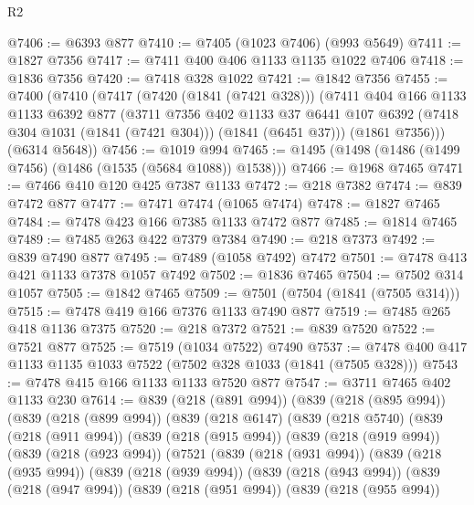 \begin{lexlean}{R2}
\begin{coremodule}
@7406 := @6393 @877
@7410 := @7405 (@1023 @7406) (@993 @5649)
@7411 := @1827 @7356
@7417 := @7411 @400 @406 @1133 @1135 @1022 @7406
@7418 := @1836 @7356
@7420 := @7418 @328 @1022
@7421 := @1842 @7356
@7455 := @7400
    (@7410
      (@7417
        (@7420 (@1841 (@7421 @328)))
        (@7411
          @404
          @166
          @1133
          @1133
          @6392
          @877
          (@3711
            @7356
            @402
            @1133
            @37
            @6441
            @107
            @6392
            (@7418 @304 @1031 (@1841 (@7421 @304)))
            (@1841 (@6451 @37)))
          (@1861 @7356)))
      (@6314 @5648))
@7456 := @1019 @994
@7465 := @1495 (@1498 (@1486 (@1499 @7456) (@1486 (@1535 (@5684 @1088)) @1538)))
@7466 := @1968 @7465
@7471 := @7466 @410 @120 @425 @7387 @1133
@7472 := @218 @7382
@7474 := @839 @7472 @877
@7477 := @7471 @7474 (@1065 @7474)
@7478 := @1827 @7465
@7484 := @7478 @423 @166 @7385 @1133 @7472 @877
@7485 := @1814 @7465
@7489 := @7485 @263 @422 @7379 @7384
@7490 := @218 @7373
@7492 := @839 @7490 @877
@7495 := @7489 (@1058 @7492) @7472
@7501 := @7478 @413 @421 @1133 @7378 @1057 @7492
@7502 := @1836 @7465
@7504 := @7502 @314 @1057
@7505 := @1842 @7465
@7509 := @7501 (@7504 (@1841 (@7505 @314)))
@7515 := @7478 @419 @166 @7376 @1133 @7490 @877
@7519 := @7485 @265 @418 @1136 @7375
@7520 := @218 @7372
@7521 := @839 @7520
@7522 := @7521 @877
@7525 := @7519 (@1034 @7522) @7490
@7537 := @7478 @400 @417 @1133 @1135 @1033 @7522 (@7502 @328 @1033 (@1841 (@7505 @328)))
@7543 := @7478 @415 @166 @1133 @1133 @7520 @877
@7547 := @3711 @7465 @402 @1133 @230
@7614 := @839
    (@218 (@891 @994))
    (@839
      (@218 (@895 @994))
      (@839
        (@218 (@899 @994))
        (@839
          (@218 @6147)
          (@839
            (@218 @5740)
            (@839
              (@218 (@911 @994))
              (@839
                (@218 (@915 @994))
                (@839
                  (@218 (@919 @994))
                  (@839
                    (@218 (@923 @994))
                    (@7521
                      (@839
                        (@218 (@931 @994))
                        (@839
                          (@218 (@935 @994))
                          (@839
                            (@218 (@939 @994))
                            (@839
                              (@218 (@943 @994))
                              (@839
                                (@218 (@947 @994))
                                (@839
                                  (@218 (@951 @994))
                                  (@839
                                    (@218 (@955 @994))

\end{coremodule}
\end{lexlean}
